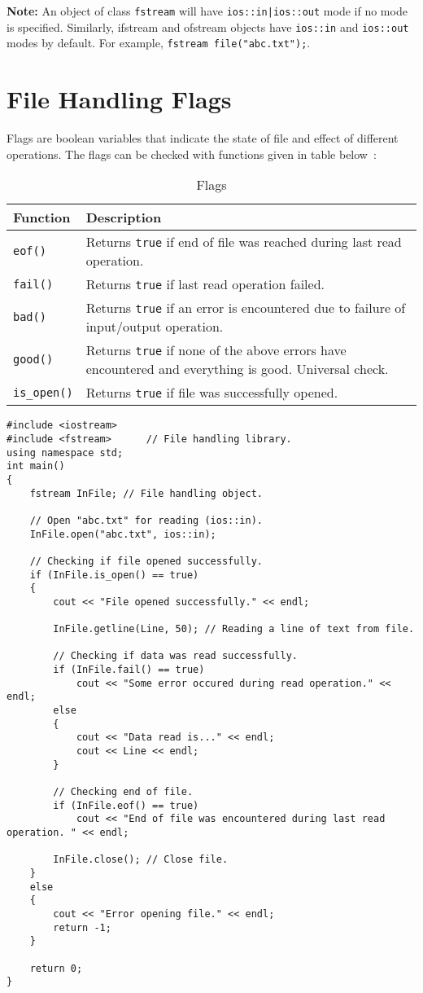 \documentclass[12pt,a4paper]{article}
\begin{document}
\newline
\noindent\textbf{Note: }An object of class \verb|fstream| will have \verb$ios::in|ios::out$ mode if no mode is specified. Similarly, ifstream and ofstream objects have \verb|ios::in| and \verb|ios::out| modes by default. For example, \verb|fstream file("abc.txt");|.
\section{File Handling Flags}
Flags are boolean variables that indicate the state of file and effect of different operations. The flags can be checked with functions given in table below~\cite{Ref:CPP-ios-flags}:
\begin{table}[H]
\begin{center}
\vspace{0.3cm}
	\begin{tabular}{lp{9cm}}
	\hline \hline
		\textbf{Function} \rule{0pt}{2.6ex} & \textbf{Description}\\
		\hline
		\verb|eof()| \rule{0pt}{2.6ex} & Returns \verb|true| if end of file was reached during last read operation.\\
		\verb|fail()| \rule{0pt}{2.6ex} & Returns \verb|true| if last read operation failed.\\
		\verb|bad()| \rule{0pt}{2.6ex} & Returns \verb|true| if an error is encountered due to failure of input/output operation.\\
		\verb|good()| \rule{0pt}{2.6ex} & Returns \verb|true| if none of the above errors have encountered and everything is good. Universal check.\\
		\verb|is_open()| \rule{0pt}{2.6ex} & Returns \verb|true| if file was successfully opened.\\
		\hline \hline
	\end{tabular}
\end{center}
\label{Flags}
\caption{Flags}
\end{table}
\begin{lstlisting}[caption={Reading a line from text file with error checking}]
#include <iostream>
#include <fstream>		// File handling library.
using namespace std;
int main()
{
	fstream InFile;	// File handling object.

	// Open "abc.txt" for reading (ios::in).
	InFile.open("abc.txt", ios::in);

	// Checking if file opened successfully.
	if (InFile.is_open() == true)
	{
		cout << "File opened successfully." << endl;

		InFile.getline(Line, 50); // Reading a line of text from file.

		// Checking if data was read successfully.
		if (InFile.fail() == true)
			cout << "Some error occured during read operation." << endl;
		else
		{
			cout << "Data read is..." << endl;
			cout << Line << endl;
		}

		// Checking end of file.
		if (InFile.eof() == true)
			cout << "End of file was encountered during last read operation. " << endl;

		InFile.close();	// Close file.
	}
	else
	{
		cout << "Error opening file." << endl;
		return -1;
	}

	return 0;
}
\end{lstlisting}
\end{document}
